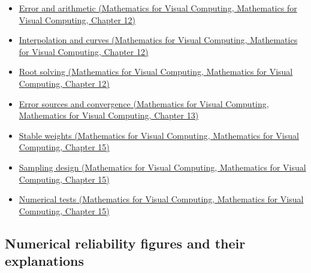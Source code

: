 \begin{itemize}
\tightlist
\item
  \href{../02-Mathematics-for-Visual-Computing/main.pdf\#nameddest=02-foundations-ii-ch028-floating-point-answers-error-conditioning-stability-and-stable-arithmetic}{Error and arithmetic (Mathematics for Visual Computing, Mathematics for Visual Computing, Chapter 12)}
\item
  \href{../02-Mathematics-for-Visual-Computing/main.pdf\#nameddest=02-foundations-ii-ch028-reconstructing-values-and-curves-between-samples}{Interpolation and curves (Mathematics for Visual Computing, Mathematics for Visual Computing, Chapter 12)}
\item
  \href{../02-Mathematics-for-Visual-Computing/main.pdf\#nameddest=02-foundations-ii-ch028-finding-roots-with-guarantees-and-convergence-checks}{Root solving (Mathematics for Visual Computing, Mathematics for Visual Computing, Chapter 12)}
\item
  \href{../02-Mathematics-for-Visual-Computing/main.pdf\#nameddest=02-foundations-ii-ch029-separate-discretization-truncation-and-roundoff-measure-convergence}{Error sources and convergence (Mathematics for Visual Computing, Mathematics for Visual Computing, Chapter 13)}
\item
  \href{../02-Mathematics-for-Visual-Computing/main.pdf\#nameddest=02-foundations-ii-ch031-keep-probability-weights-stable-before-sampling}{Stable weights (Mathematics for Visual Computing, Mathematics for Visual Computing, Chapter 15)}
\item
  \href{../02-Mathematics-for-Visual-Computing/main.pdf\#nameddest=02-foundations-ii-ch031-design-samples-without-replacement-stratified-and-low-discrepancy}{Sampling design (Mathematics for Visual Computing, Mathematics for Visual Computing, Chapter 15)}
\item
  \href{../02-Mathematics-for-Visual-Computing/main.pdf\#nameddest=02-foundations-ii-ch031-test-numerical-methods-and-benchmark-reproducibly}{Numerical tests (Mathematics for Visual Computing, Mathematics for Visual Computing, Chapter 15)}
\end{itemize}

\subsection{Numerical reliability figures and their explanations}\label{appendix-cb5af353ef77-numerical-reliability-figures-and-their-explanations}

